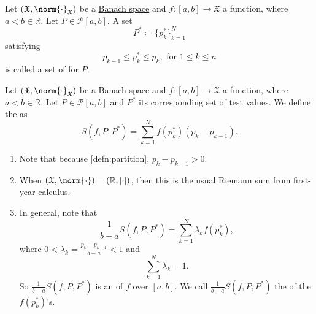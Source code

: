 \documentclass[notoc,notitlepage]{tufte-book}
\begin{document}
\begin{defn}\label{defn:test_values}
  Let $(\mathfrak{X}, \norm{\cdot}_{\mathfrak{X}})$ be a
  \hyperref[defn:banach_space]{Banach space} and $f:[a, b] \to \mathfrak{X}$ a
  function, where $a < b \in \mathbb{R}$. Let $P \in \mathcal{P}[a, b]$. A set
  \begin{equation*}
    P^* \coloneqq \{ p_k^* \}_{k = 1}^{N}
  \end{equation*}
  satisfying
  \begin{equation*}
    p_{k-1} \leq p_k^* \leq p_k, \text{ for } 1 \leq k \leq n
  \end{equation*}
  is called a set of  for $P$.
\end{defn}

\begin{defn}\label{defn:riemann_sum}
  Let $(\mathfrak{X}, \norm{\cdot}_{\mathfrak{X}})$ be a
  \hyperref[defn:banach_space]{Banach space} and $f:[a, b] \to \mathfrak{X}$ a
  function, where $a < b \in \mathbb{R}$. Let $P \in \mathcal{P}[a, b]$ and
  $P^*$ its corresponding set of test values. We define the  as
  \begin{equation*}
    S(f, P, P^*) = \sum_{k=1}^{N} f(p_k^*)(p_k - p_{k-1}).
  \end{equation*}
\end{defn}

\begin{remark}
  \begin{enumerate}
    \item Note that because \cref{defn:partition}, $p_k - p_{k-1} > 0$.
    \item When $(\mathfrak{X}, \norm{\cdot}) = (\mathbb{R}, \abs{\cdot})$, then
      this is the usual Riemann sum from first-year calculus.
    \item In general, note that
      \begin{equation*}
        \frac{1}{b - a} S(f, P, P^*) = \sum_{k=1}^{N} \lambda_k f(p_k^*),
      \end{equation*}
      where $0 < \lambda_k = \frac{p_k - p_{k-1}}{b - a} < 1$ and 
      \begin{equation*}
        \sum_{k=1}^{N} \lambda_k = 1.
      \end{equation*}
      So $\frac{1}{b - a} S(f, P, P^*)$ is an  of $f$ over
      $[a, b]$. We call $\frac{1}{b - a} S(f, P, P^*)$ the  of the $f(p_{k}^*)$'s.
  \end{enumerate}
\end{remark}
\end{document}
